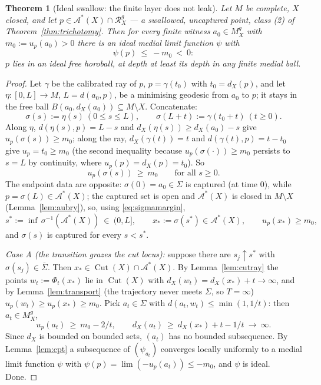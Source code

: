 \documentclass[11pt]{article}
\newtheorem{theorem}{Theorem}[section]
\theoremstyle{remark}
\newcommand{\X}{X}
\newcommand{\Mg}{M^{g}_{\X}}
\newcommand{\Rg}{\mathcal{R}^{g}_{\X}}
\newcommand{\dX}{d_{\X}}
\newcommand{\Cut}{\operatorname{Cut}}
\newcommand{\Aub}{\mathcal{A}^{\ast}}
\begin{document}
\begin{theorem}[Ideal swallow: the finite layer does not leak]
\label{thm:idealswallow}
Let $M$ be complete, $\X$ closed, and let $p\in\Aub(\X)\cap\Rg$ ---
a swallowed, uncaptured point, class \textup{(2)} of
Theorem~\ref{thm:trichotomy}. Then for \emph{every} finite witness
$a_{0}\in\Mg$ with $m_{0}:=u_{p}(a_{0})>0$ there is an \emph{ideal}
medial limit function $\psi$ with
\[
  \psi(p)\ \le\ -m_{0}\ <\ 0 :
\]
$p$ lies in an ideal free horoball, at depth at least its depth in
any finite medial ball.
\end{theorem}

\begin{proof}
Let $\gamma$ be the calibrated ray of $p$, $p=\gamma(t_{0})$ with
$t_{0}=\dX(p)$, and let $\eta:[0,L]\to M$, $L=d(a_{0},p)$, be a
minimising geodesic from $a_{0}$ to $p$; it stays in the free ball
$B(a_{0},\dX(a_{0}))\subseteq M\setminus\X$. Concatenate:
\[
  \sigma(s):=\eta(s)\ (0\le s\le L),\qquad
  \sigma(L+t):=\gamma(t_{0}+t)\ (t\ge0).
\]
Along $\eta$, $d(\eta(s),p)=L-s$ and $\dX(\eta(s))\ge\dX(a_{0})-s$
give $u_{p}(\sigma(s))\ge m_{0}$; along the ray,
$\dX(\gamma(t))=t$ and $d(\gamma(t),p)=t-t_{0}$ give
$u_{p}=t_{0}\ge m_{0}$ (the second inequality because
$u_{p}(\sigma(\cdot))\ge m_{0}$ persists to $s=L$ by continuity,
where $u_{p}(p)=\dX(p)=t_{0}$). So
\begin{equation}\label{eq:sigmamargin}
  u_{p}(\sigma(s))\ \ge\ m_{0}\qquad\text{for all }s\ge0 .
\end{equation}
The endpoint data are opposite: $\sigma(0)=a_{0}\in\Sigma$ is
captured (at time $0$), while $p=\sigma(L)\in\Aub(\X)$; the captured
set is open and $\Aub(\X)$ is closed in $M\setminus\X$
(Lemma~\ref{lem:aubry}), so, using \eqref{eq:sigmamargin},
\[
  s^{\ast}:=\inf\,\sigma^{-1}(\Aub(\X))\ \in\ (0,L],\qquad
  x_{\ast}:=\sigma(s^{\ast})\in\Aub(\X),\qquad
  u_{p}(x_{\ast})\ge m_{0},
\]
and $\sigma(s)$ is captured for every $s<s^{\ast}$.

\emph{Case A (the transition grazes the cut locus):} suppose there
are $s_{j}\uparrow s^{\ast}$ with
$\sigma(s_{j})\in\overline{\Sigma}$. Then
$x_{\ast}\in\Cut(\X)\cap\Aub(\X)$. By Lemma~\ref{lem:cutray} the
points $w_{t}:=\Phi_{t}(x_{\ast})$ lie in $\Cut(\X)$ with
$\dX(w_{t})=\dX(x_{\ast})+t\to\infty$, and by
Lemma~\ref{lem:transport} (the trajectory never meets $\Sigma$, so
$T=\infty$) $u_{p}(w_{t})\ge u_{p}(x_{\ast})\ge m_{0}$. Pick
$a_{t}\in\Sigma$ with $d(a_{t},w_{t})\le\min(1,1/t)$: then
$a_{t}\in\Mg$,
\[
  u_{p}(a_{t})\ \ge\ m_{0}-2/t,\qquad
  \dX(a_{t})\ \ge\ \dX(x_{\ast})+t-1/t\ \to\ \infty .
\]
Since $\dX$ is bounded on bounded sets, $(a_{t})$ has no bounded
subsequence. By Lemma~\ref{lem:cpt} a subsequence of
$(\psi_{a_{t}})$ converges locally uniformly to a medial limit
function $\psi$ with $\psi(p)=\lim(-u_{p}(a_{t}))\le-m_{0}$, and
$\psi$ is ideal. Done.


\end{proof}
\end{document}
